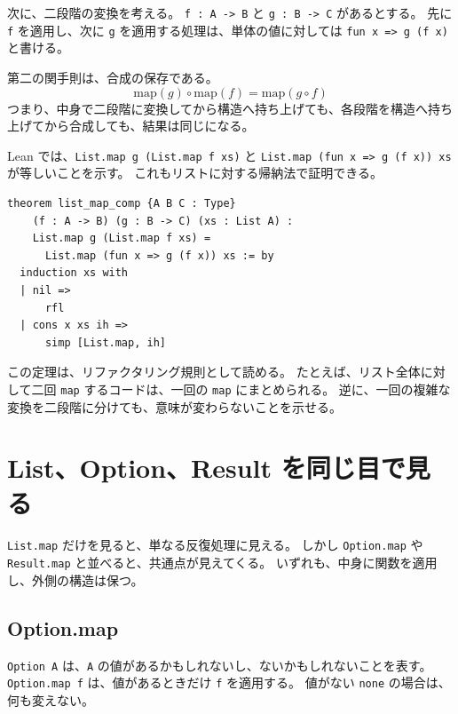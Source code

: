 次に、二段階の変換を考える。
\texttt{f : A -> B} と \texttt{g : B -> C} があるとする。
先に \texttt{f} を適用し、次に \texttt{g} を適用する処理は、単体の値に対しては \texttt{fun x => g (f x)} と書ける。

\begin{definitionbox}
第二の関手則は、合成の保存である。
\[
  \mathrm{map}(g) \circ \mathrm{map}(f) = \mathrm{map}(g \circ f)
\]
つまり、中身で二段階に変換してから構造へ持ち上げても、各段階を構造へ持ち上げてから合成しても、結果は同じになる。
\end{definitionbox}


Lean では、\texttt{List.map g (List.map f xs)} と \texttt{List.map (fun x => g (f x)) xs} が等しいことを示す。
これもリストに対する帰納法で証明できる。

\begin{listing}[htbp]
\begin{verbatim}
theorem list_map_comp {A B C : Type}
    (f : A -> B) (g : B -> C) (xs : List A) :
    List.map g (List.map f xs) =
      List.map (fun x => g (f x)) xs := by
  induction xs with
  | nil =>
      rfl
  | cons x xs ih =>
      simp [List.map, ih]
\end{verbatim}
\caption{List.map は合成を保存する}
\label{lst:ch08_list_map_comp}
\end{listing}

この定理は、リファクタリング規則として読める。
たとえば、リスト全体に対して二回 \texttt{map} するコードは、一回の \texttt{map} にまとめられる。
逆に、一回の複雑な変換を二段階に分けても、意味が変わらないことを示せる。

\section{List、Option、Result を同じ目で見る}

\texttt{List.map} だけを見ると、単なる反復処理に見える。
しかし \texttt{Option.map} や \texttt{Result.map} と並べると、共通点が見えてくる。
いずれも、中身に関数を適用し、外側の構造は保つ。

\subsection{Option.map}

\texttt{Option A} は、\texttt{A} の値があるかもしれないし、ないかもしれないことを表す。
\texttt{Option.map f} は、値があるときだけ \texttt{f} を適用する。
値がない \texttt{none} の場合は、何も変えない。

